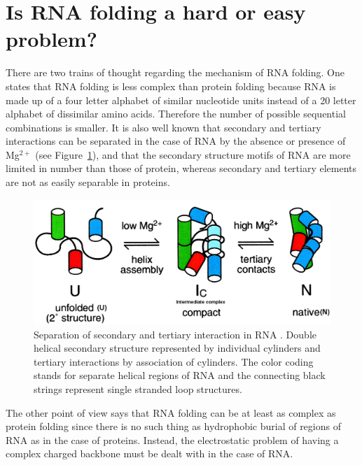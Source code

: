 \section{Is RNA folding a hard or easy problem?}
There  are  two trains  of  thought  regarding  the mechanism  of  RNA
folding.  One  states that  RNA folding is  less complex  than protein
folding  \cite{tinoco1999} because  RNA is  made up  of a  four letter
alphabet of similar  nucleotide units instead of a  20 letter alphabet
of  dissimilar   amino  acids.   Therefore  the   number  of  possible
sequential  combinations  is smaller.   It  is  also  well known  that
secondary and  tertiary interactions can  be separated in the  case of
RNA  by the absence  or presence  of Mg$^{2+}$  \cite{rangan2003} (see
Figure~\ref{fig:folding}), and  that the secondary structure motifs
of RNA are more limited  in  number  than  those  of protein,  whereas
secondary  and tertiary elements are not as easily separable in
proteins.
\begin{figure}[ht]
\centering
\includegraphics[scale=0.3]{Chapter1/rangan2003pnas.png}
\caption{Separation of secondary and tertiary interaction in RNA
  \cite{rangan2003}. Double helical secondary structure represented by
  individual cylinders and tertiary interactions by association of
  cylinders. The color coding stands for separate helical regions of
  RNA and the connecting black strings represent single stranded loop
  structures.}
\label{fig:folding}
\end{figure}
The  other point of  view says  that RNA  folding can  be at  least as
complex as protein folding \cite{moore1999a, sorin2004} since there is
no such thing  as hydrophobic burial of regions of RNA  as in the case
of proteins.  Instead, the electrostatic  problem of having  a complex
charged backbone must be dealt with in the case of RNA.
